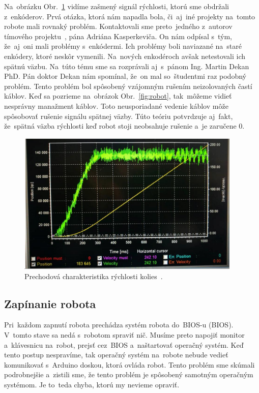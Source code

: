 Na~obrázku Obr.~\ref{fig:prechChar} vidíme zašmený signál rýchlosti, ktorú sme obdržali z~enkóderov. Prvá
otázka, ktorá nám napadla bola, či~aj~iné projekty na~tomto robote mali rovnaký problém. Kontaktovali
sme preto~jedného z~autorov tímového projektu~\cite{timovyProjekt}, pána Adriána Kasperkeviča. On nám odpísal s~tým,
že~aj~oni mali problémy s~enkódermi. Ich problémy boli naviazané na~staré enkódery, ktoré neskôr
vymenili. Na~nových enkodéroch avšak netestovali ich spätnú väzbu. Na~túto tému sme sa rozprávali
aj~s~pánom Ing. Martin Dekan PhD. Pán doktor Dekan nám spomínal, že~on mal so~študentmi raz podobný
problém. Tento problém bol spôsobený vzájomným rušením neizolovaných častí káblov. Keď sa pozrieme
na~obrázok Obr.~\ref{fig:robot}, tak~môžeme vidieť nesprávny manažment káblov. Toto neusporiadané vedenie káblov môže
spôsobovať rušenie signálu spätnej väzby. Túto teóriu potvrdzuje aj~fakt, že~spätná väzba rýchlosti
keď robot stoji neobsahuje rušenie a~je zaručene 0.

\begin{figure}[!htbp]
	\begin{center}
		\includegraphics[width=0.95\textwidth]{img/robotSpeedChar.png}
	\end{center}
	\caption{Prechodová charakteristika rýchlosti kolies~\cite{timovyProjekt}. }
	\label{fig:prechChar}
\end{figure}

\subsection{Zapínanie robota}
\label{subsec:zapinanieRobota}

Pri~každom zapnutí robota prechádza systém robota do~BIOS-u (\acrlong{BIOS}). V~tomto stave sa nedá s~robotom spraviť
nič. Musíme preto napojiť monitor a~klávesnicu na~robot, prejsť cez~BIOS a~naštartovať operačný systém. Keď tento
postup nespravíme, tak operačný systém na~robote nebude vedieť komunikovať s~Arduino doskou, ktorá ovláda robot.
Tento problém sme skúmali podrobnejšie a~zistili sme, že tento problém je spôsobený samotným operačným systémom.
Je to~teda chyba, ktorú my nevieme opraviť.

\clearpage
